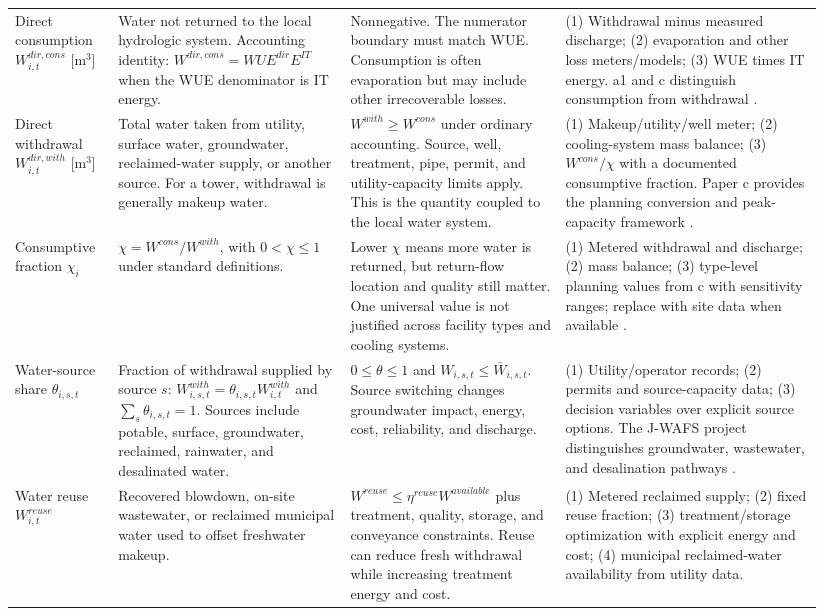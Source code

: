 \documentclass[10pt]{article}
\begin{document}
\begin{landscape}
\begin{longtable}{@{}P{0.12\linewidth}P{0.27\linewidth}P{0.25\linewidth}P{0.30\linewidth}@{}}
Direct consumption $W^{dir,cons}_{i,t}$ [m$^3$] & Water not returned to the local hydrologic system. Accounting identity: $W^{dir,cons}=WUE^{dir}E^{IT}$ when the WUE denominator is IT energy. & Nonnegative. The numerator boundary must match WUE. Consumption is often evaporation but may include other irrecoverable losses. & (1) Withdrawal minus measured discharge; (2) evaporation and other loss meters/models; (3) WUE times IT energy. a1 and c distinguish consumption from withdrawal \cite{li2023thirsty,han2026pipe}. \\

Direct withdrawal $W^{dir,with}_{i,t}$ [m$^3$] & Total water taken from utility, surface water, groundwater, reclaimed-water supply, or another source. For a tower, withdrawal is generally makeup water. & $W^{with}\ge W^{cons}$ under ordinary accounting. Source, well, treatment, pipe, permit, and utility-capacity limits apply. This is the quantity coupled to the local water system. & (1) Makeup/utility/well meter; (2) cooling-system mass balance; (3) $W^{cons}/\chi$ with a documented consumptive fraction. Paper c provides the planning conversion and peak-capacity framework \cite{han2026pipe}. \\

Consumptive fraction $\chi_i$ & $\chi=W^{cons}/W^{with}$, with $0<\chi\le1$ under standard definitions. & Lower $\chi$ means more water is returned, but return-flow location and quality still matter. One universal value is not justified across facility types and cooling systems. & (1) Metered withdrawal and discharge; (2) mass balance; (3) type-level planning values from c with sensitivity ranges; replace with site data when available \cite{han2026pipe}. \\

Water-source share $\theta_{i,s,t}$ & Fraction of withdrawal supplied by source $s$: $W^{with}_{i,s,t}=\theta_{i,s,t}W^{with}_{i,t}$ and $\sum_s\theta_{i,s,t}=1$. Sources include potable, surface, groundwater, reclaimed, rainwater, and desalinated water. & $0\le\theta\le1$ and $W_{i,s,t}\le\bar W_{i,s,t}$. Source switching changes groundwater impact, energy, cost, reliability, and discharge. & (1) Utility/operator records; (2) permits and source-capacity data; (3) decision variables over explicit source options. The J-WAFS project distinguishes groundwater, wastewater, and desalination pathways \cite{amin2026jwafs}. \\

Water reuse $W^{reuse}_{i,t}$ & Recovered blowdown, on-site wastewater, or reclaimed municipal water used to offset freshwater makeup. & $W^{reuse}\le\eta^{reuse}W^{available}$ plus treatment, quality, storage, and conveyance constraints. Reuse can reduce fresh withdrawal while increasing treatment energy and cost. & (1) Metered reclaimed supply; (2) fixed reuse fraction; (3) treatment/storage optimization with explicit energy and cost; (4) municipal reclaimed-water availability from utility data. \\


\end{longtable}
\end{landscape}
\end{document}
